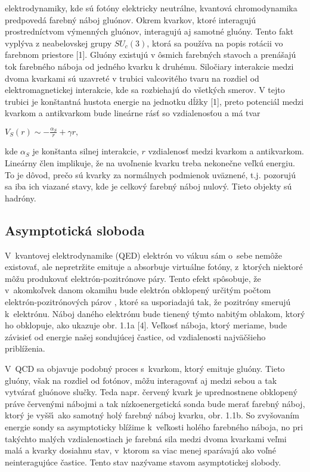 elektrodynamiky, kde sú fotóny elektricky neutrálne, kvantová
chromodynamika predpovedá farebný náboj gluónov. Okrem kvarkov, ktoré
interagujú prostredníctvom výmenných gluónov, interagujú aj samotné gluóny.
Tento fakt vyplýva z neabelovskej grupy $SU_c(3)$, ktorá sa používa na popis
rotácii vo farebnom priestore [1]. Gluóny existujú v ôsmich farebných
stavoch a prenášajú tok farebného náboja od jedného kvarku k druhému. 
Siločiary interakcie medzi dvoma kvarkami sú
uzavreté v trubici valcovitého tvaru na rozdiel od elektromagnetickej  
interakcie, kde sa rozbiehajú do všetkých smerov. V tejto trubici
je konštantná hustota energie na jednotku dĺžky [1], preto potenciál medzi
kvarkom a antikvarkom bude lineárne rásť so vzdialenosťou a má tvar
\begin{center} 
{\large $V_{S}(r) \sim -\frac{\alpha_{S}}{r} + \gamma r,$ }
\end{center}
kde $\alpha_{S}$ je konštanta silnej interakcie, $r$ vzdialenosť medzi
kvarkom a antikvarkom. Lineárny člen implikuje, že na uvoľnenie
kvarku treba nekonečne veľkú energiu. To je dôvod, prečo sú kvarky za
normálnych podmienok uväznené, t.j. pozorujú sa iba ich viazané stavy,
kde je celkový farebný náboj nulový. Tieto  objekty sú hadróny.


\subsection{Asymptotická sloboda}
V~kvantovej elektrodynamike (QED) elektrón vo vákuu sám o~sebe nemô\v
ze existovať, ale nepretržite  emituje a absorbuje virtuálne
fotóny,  z~ktorých niektoré môžu produkovať elektrón-pozitrónove
páry. Tento efekt spôsobuje, že v~akomkoľvek danom okamihu bude
elektrón obklopený určitým  počtom elektrón-pozitrónových
párov , ktoré sa usporiadajú tak, že
pozi\-tróny smerujú  k~elektrónu. Náboj daného elektrónu bude
tienený týmto nabitým oblakom, ktorý ho obklopuje, ako ukazuje obr.
1.1a [4]. Veľkosť náboja, ktorý meriame, bude závisieť od
energie našej  sondujúcej častice, od vzdialenosti najväč\v
sieho  priblíženia. 

V~QCD sa objavuje podobný proces
s~kvarkom, ktorý emituje gluóny. Tieto gluóny, však na rozdiel od
fotónov, môžu interagovať aj medzi sebou a tak vytvárať
gluónove slučky. Teda napr. červený kvark je uprednostnene
obklopený práve červenými nábojmi a tak nízkoenergetická sonda
bude merať farebný náboj, ktorý je vyšš\'\i\, ako samotný
holý farebný náboj kvarku, obr. 1.1b. So zvyšovaním energie
sondy sa asymptoticky blížime  k~veľkosti holého farebného
náboja, no pri takýchto malých vzdialenostiach je farebná sila medzi
dvoma kvarkami veľmi malá a kvarky dosiahnu stav, v~ktorom sa viac
menej sparávajú ako voľné neinte\-ragujúce častice. Tento stav
nazývame stavom asymptotickej slobody.

